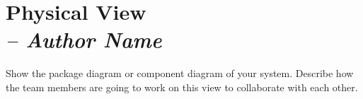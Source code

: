 \chapter{Physical View \\
\small{\textit{-- Author Name}}
\label{Chapter::PhysicalView}}

Show the package diagram or component diagram of your system. Describe how the team
members are going to work on this view to collaborate with each other.